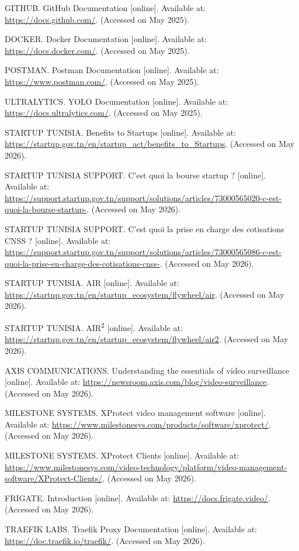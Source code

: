 \documentclass[12pt,a4paper,oneside]{report}
\begin{document}
\begin{enumerate}[label={[\arabic*]}, start=6]
\item GITHUB. GitHub Documentation [online]. Available at: \url{https://docs.github.com/}. (Accessed on May 2025).
\item DOCKER. Docker Documentation [online]. Available at: \url{https://docs.docker.com/}. (Accessed on May 2025).
\item POSTMAN. Postman Documentation [online]. Available at: \url{https://www.postman.com/}. (Accessed on May 2025).
\item ULTRALYTICS. YOLO Documentation [online]. Available at: \url{https://docs.ultralytics.com/}. (Accessed on May 2025).
\item STARTUP TUNISIA. Benefits to Startups [online]. Available at: \url{https://startup.gov.tn/en/startup_act/benefits_to_Startups}. (Accessed on May 2026).
\item STARTUP TUNISIA SUPPORT. C'est quoi la bourse startup ? [online]. Available at: \url{https://support.startup.gov.tn/support/solutions/articles/73000565020-c-est-quoi-la-bourse-startup-}. (Accessed on May 2026).
\item STARTUP TUNISIA SUPPORT. C'est quoi la prise en charge des cotisations CNSS ? [online]. Available at: \url{https://support.startup.gov.tn/support/solutions/articles/73000565086-c-est-quoi-la-prise-en-charge-des-cotisations-cnss-}. (Accessed on May 2026).
\item STARTUP TUNISIA. AIR [online]. Available at: \url{https://startup.gov.tn/en/startup_ecosystem/flywheel/air}. (Accessed on May 2026).
\item STARTUP TUNISIA. AIR\textsuperscript{2} [online]. Available at: \url{https://startup.gov.tn/en/startup_ecosystem/flywheel/air2}. (Accessed on May 2026).
\item AXIS COMMUNICATIONS. Understanding the essentials of video surveillance [online]. Available at: \url{https://newsroom.axis.com/blog/video-surveillance}. (Accessed on May 2026).
\item MILESTONE SYSTEMS. XProtect video management software [online]. Available at: \url{https://www.milestonesys.com/products/software/xprotect/}. (Accessed on May 2026).
\item MILESTONE SYSTEMS. XProtect Clients [online]. Available at: \url{https://www.milestonesys.com/video-technology/platform/video-management-software/XProtect-Clients/}. (Accessed on May 2026).
\item FRIGATE. Introduction [online]. Available at: \url{https://docs.frigate.video/}. (Accessed on May 2026).
\item TRAEFIK LABS. Traefik Proxy Documentation [online]. Available at: \url{https://doc.traefik.io/traefik/}. (Accessed on May 2026).

\end{enumerate}
\end{document}
